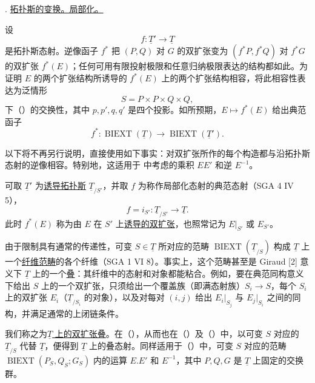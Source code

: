 

. \underline{拓扑斯的变换。局部化。}

设
\[
 f:\underline T'\longrightarrow\underline T
\]
是拓扑斯态射。逆像函子 $f^*$ 把 $(P,Q)$ 对 $G$ 的双扩张变为 $(f^*P,f^*Q)$ 对 $f^*G$ 的双扩张 $f^*(E)$；任何可用有限投射极限和任意归纳极限表达的结构都如此。为证明 $E$ 的两个扩张结构所诱导的 $f^*(E)$ 上的两个扩张结构相容，将此相容性表达为泛情形
\[
 S=P\times P\times Q\times Q,
\]
下（）的交换性，其中 $p,p',q,q'$ 是四个投影。如所预期，$E\mapsto f^*(E)$ 给出典范函子
\[
 f^*:\operatorname{BIEXT}(\underline T)
 \longrightarrow
 \operatorname{BIEXT}(\underline T').
\]


以下将不再另行说明，直接使用如下事实：对双扩张所作的每个构造都与沿拓扑斯态射的逆像相容。特别地，这适用于  中考虑的乘积 $EE'$ 和逆 $E^{-1}$。

可取 $\underline T'$ 为\underline{诱导拓扑斯} $\underline T_{/S'}$，并取 $f$ 为称作局部化态射的典范态射（SGA 4 IV 5），
\[
 f=i_{S'}:\underline T_{/S'}\longrightarrow\underline T.
\]
此时 $f^*(E)$ 称为由 $E$ 在 $S'$ 上\underline{诱导的双扩张}，也照常记为 $E|_{S'}$ 或 $E_{S'}$。

由于限制具有通常的传递性，可变 $S\in\underline T$ 所对应的范畴 $\operatorname{BIEXT}(\underline T_{/S})$ 构成 $\underline T$ 上一个\underline{纤维范畴}的各个纤维（SGA 1 VI 8）。事实上，这个范畴甚至是 Giraud [2] 意义下 $\underline T$ 上的一个\underline{叠}：其纤维中的态射和对象都能粘合。例如，要在典范同构意义下给出 $S$ 上的一个双扩张，只须给出一个覆盖族（即满态射族）$S_i\longrightarrow S$，每个 $S_i$ 上的双扩张 $E_i$（$\underline T_{/S_i}$ 的对象），以及对每对 $(i,j)$ 给出 $E_i|_{S_j}$ 与 $E_j|_{S_i}$ 之间的同构，并满足通常的上闭链条件。

我们称之为\underline{$\underline T$ 上的双扩张叠}。在（），从而也在（）及（）中，以可变 $S$ 对应的 $\underline T_{/S}$ 代替 $\underline T$，便得到 $\underline T$ 上的叠态射。同样适用于（）中，可变 $S$ 对应的范畴 $\operatorname{BIEXT}(P_S,Q_S;G_S)$ 内的运算 $E.E'$ 和 $E^{-1}$，其中 $P,Q,G$ 是 $\underline T$ 上固定的交换群。


